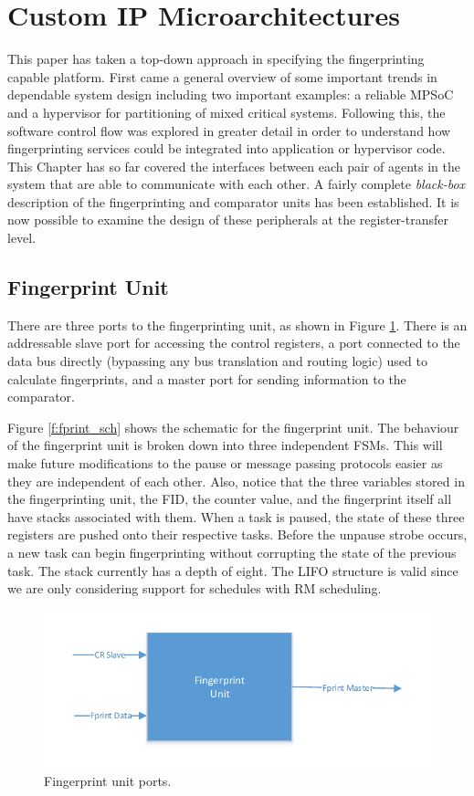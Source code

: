 \section{Custom IP Microarchitectures}
This paper has taken a top-down approach in specifying the fingerprinting capable platform. First came a general overview of some important trends in dependable system design including two important examples: a reliable MPSoC and a hypervisor for partitioning of mixed critical systems. Following this, the software control flow was explored in greater detail in order to understand how fingerprinting services could be integrated into application or hypervisor code. This Chapter has so far covered the interfaces between each pair of agents in the system that are able to communicate with each other. A fairly complete \emph{black-box} description of the fingerprinting and comparator units has been established. It is now possible to examine the design of these peripherals at the register-transfer level.

\subsection{Fingerprint Unit}
There are three ports to the fingerprinting unit, as shown in Figure \ref{f:fprint_icon}. There is an addressable slave port for accessing the control registers, a port connected to the data bus directly (bypassing any bus translation and routing logic) used to calculate fingerprints, and a master port for sending information to the comparator.

Figure \ref{f:fprint_sch} shows the schematic for the fingerprint unit. The behaviour of the fingerprint unit is broken down into three independent FSMs. This will make future modifications to the pause or message passing protocols easier as they are independent of each other. Also, notice that the three variables stored in the fingerprinting unit, the FID, the counter value, and the fingerprint itself all have stacks associated with them. When a task is paused, the state of these three registers are pushed onto their respective tasks. Before the unpause strobe occurs, a new task can begin fingerprinting without corrupting the state of the previous task. The stack currently has a depth of eight. The LIFO structure is valid since we are only considering support for schedules with RM scheduling.


\begin{figure}[h]
\centering
\includegraphics[scale=0.8]{Figures/fprint_icon}
\caption{Fingerprint unit ports.}
\label{f:fprint_icon}
\end{figure}

